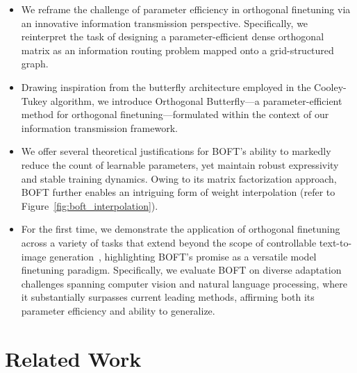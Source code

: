 \begin{itemize}[leftmargin=*,nosep]
    \item We reframe the challenge of parameter efficiency in orthogonal finetuning via an innovative information transmission perspective. Specifically, we reinterpret the task of designing a parameter-efficient dense orthogonal matrix as an information routing problem mapped onto a grid-structured graph.
    \item Drawing inspiration from the butterfly architecture employed in the Cooley-Tukey algorithm, we introduce Orthogonal Butterfly—a parameter-efficient method for orthogonal finetuning—formulated within the context of our information transmission framework.
    \item We offer several theoretical justifications for BOFT’s ability to markedly reduce the count of learnable parameters, yet maintain robust expressivity and stable training dynamics. Owing to its matrix factorization approach, BOFT further enables an intriguing form of weight interpolation (refer to Figure~\ref{fig:boft_interpolation}).
    \item For the first time, we demonstrate the application of orthogonal finetuning across a variety of tasks that extend beyond the scope of controllable text-to-image generation~\cite{qiu2023controlling}, highlighting BOFT’s promise as a versatile model finetuning paradigm. Specifically, we evaluate BOFT on diverse adaptation challenges spanning computer vision and natural language processing, where it substantially surpasses current leading methods, affirming both its parameter efficiency and ability to generalize.
\end{itemize}

\section{Related Work}

